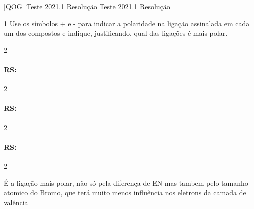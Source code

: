 \documentclass[\mainfilename]{subfiles}
\begin{document}

[QOG]
{Teste 2021.1 Resolução} %
{Teste 2021.1 Resolução} %

\renewcommand\thesubquestion{Q\arabic{question} \alph{subquestion})}

\begin{questionBox}1{ %
    Use os símbolos \chemdelta+ e \chemdelta- para indicar a polaridade na ligação assinalada em cada um dos compostos e indique, justificando, qual das ligações é mais polar.
} %
    \begin{multicols}{3}

        \begin{questionBox}2{ %
        } %
            \paragraph*{RS:}
        \end{questionBox}

        \begin{questionBox}2{ %
        } %
            \paragraph*{RS:}
        \end{questionBox}

        \setcounter{subquestion}{3}

        \begin{questionBox}2{ %
        } %
            \paragraph*{RS:}
        \end{questionBox}

    \end{multicols}

    \setcounter{subquestion}{2}

    \begin{questionBox}2{ %
    } %

        \begin{answerBox}{
        } %
            É a ligação mais polar, não só pela diferença de EN mas tambem pelo tamanho atomico do Bromo, que terá muito menos influência nos eletrons da camada de valência
        \end{answerBox}
    \end{questionBox}
\end{questionBox}
\end{document}
